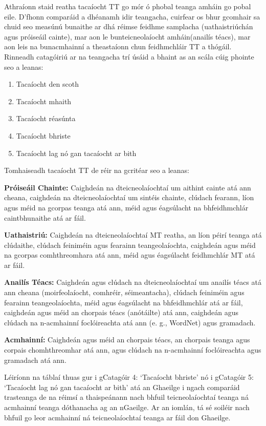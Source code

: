 \begin{multicols}{2}
Athraíonn staid reatha tacaíocht TT go mór ó phobal teanga amháin go pobal eile. D'fhonn comparáid a dhéanamh idir teangacha, cuirfear os bhur gcomhair sa chuid seo measúnú bunaithe ar dhá réimse feidhme samplacha (uathaistriúchán agus próiseáil cainte), mar aon le bunteicneolaíocht amháin(anailís téacs), mar aon leis na bunacmhainní a theastaíonn chun feidhmchláir TT a thógáil. Rinneadh catagóiriú ar na teangacha trí úsáid a bhaint as an scála cúig phointe seo a leanas:

\begin{enumerate} 
\item Tacaíocht den scoth
\item Tacaíocht mhaith
\item Tacaíocht réasúnta
\item Tacaíocht bhriste
\item Tacaíocht lag nó gan tacaíocht ar bith
\end{enumerate}

Tomhaiseadh tacaíocht TT de réir na gcritéar seo a leanas:

\textbf{Próiseáil Chainte:} Caighdeán na dteicneolaíochtaí um aithint cainte atá ann cheana, caighdeán na dteicneolaíochtaí um sintéis chainte, clúdach fearann, líon agus méid na gcorpas teanga atá ann, méid agus éagsúlacht na bhfeidhmchlár caintbhunaithe atá ar fáil.

\textbf{Uathaistriú:} Caighdeán na dteicneolaíochtaí MT reatha, an líon péirí teanga atá clúdaithe, clúdach feiniméin agus fearainn teangeolaíochta, caighdeán agus méid na gcorpas comhthreomhara atá ann, méid agus éagsúlacht feidhmchlár MT atá ar fáil.

\textbf{Anailís Téacs:} Caighdeán agus clúdach na dteicneolaíochtaí um anailís téacs atá ann cheana (moirfeolaíocht, comhréir, séimeantacha), clúdach feiniméin agus fearainn teangeolaíochta, méid agus éagsúlacht na bhfeidhmchlár atá ar fáil, caighdeán agus méid an chorpais téacs (anótáilte) atá ann, caighdeán agus clúdach na n-acmhainní foclóireachta atá ann (e. g., WordNet) agus gramadach.

\textbf{Acmhainní:} Caighdeán agus méid an chorpais téacs, an chorpais teanga agus corpais chomhthreomhar atá ann, agus clúdach na n-acmhainní foclóireachta agus gramadach atá ann.

Léiríonn na táblaí thuas gur i gCatagóir 4: ‘Tacaíocht bhriste’ nó i gCatagóir 5: ‘Tacaíocht lag nó gan tacaíocht ar bith’ atá an Ghaeilge i ngach comparáid trasteanga de na réimsí a thaispeánann nach bhfuil teicneolaíochtaí teanga ná acmhainní teanga dóthanacha ag an nGaeilge. Ar an iomlán, tá sé soiléir nach bhfuil go leor acmhainní ná teicneolaíochtaí teanga ar fáil don Ghaeilge.


\end{multicols}
